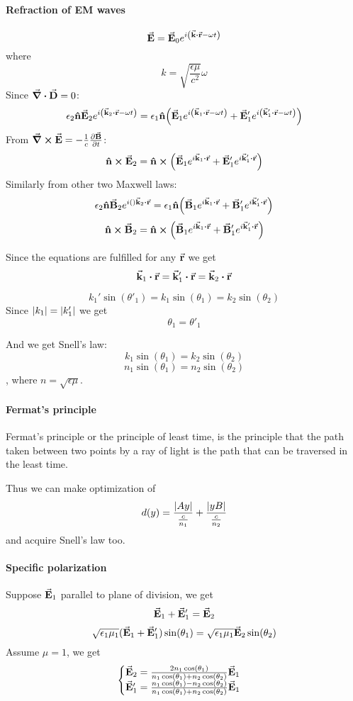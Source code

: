 \paragraph{Refraction of EM waves}

\begin{center}	
\end{center}

$$\va{E}  = \va{E}_0 e^{i\qty(\va{k} \vdot \va{r} - \omega t)}$$
where
$$k = \sqrt{\frac{\epsilon \mu}{c^2}} \omega$$
Since $\div{\va{D}} = 0$:
$$\epsilon_2 \vu{n}  \va{E}_2 e^{i\qty(\va{k}_2 \vdot \va{r} - \omega t)} = \epsilon_1 \vu{n} \qty(\va{E}_1 e^{i\qty(\va{k}_1 \vdot \va{r} - \omega t)}+\va{E}'_1 e^{i\qty(\va{k}'_1 \vdot \va{r} - \omega t)})$$
From $\curl{\va{E}} = -\frac{1}{c}\pdv{\va{B}}{t}$:
$$\vu{n} \cross \va{E}_2 = \vu{n} \cross \qty( \va{E}_1 e^{i\va{k}_1 \vdot \va{r}}+ \va{E}'_1 e^{i\va{k}'_1 \vdot \va{r}})$$
Similarly from other two Maxwell laws:
$$\epsilon_2 \vu{n}  \va{B}_2 e^{i\qty\va{k}_2 \vdot \va{r}} = \epsilon_1 \vu{n} \qty(\va{B}_1 e^{i\va{k}_1 \vdot \va{r} }+\va{B}'_1 e^{i\va{k}'_1 \vdot \va{r}})$$
$$\vu{n} \cross \va{B}_2 = \vu{n} \cross \qty( \va{B}_1 e^{i\va{k}_1 \vdot \va{r}}+ \va{B}'_1 e^{i\va{k}'_1 \vdot \va{r}})$$

Since the equations are fulfilled for any $\va{r}$ we get
$$\va{k}_1 \vdot \va{r} =\va{k}'_1 \vdot \va{r}=\va{k}_2 \vdot \va{r} $$

$$k_1' \sin(\theta'_1) = k_1 \sin (\theta_1) = k_2 \sin(\theta_2)$$
Since $\abs{k_1} = \abs{k'_1}$ we get
$$\theta_1 = \theta'_1$$

And we get Snell's law:
$$k_1 \sin(\theta_1) = k_2 \sin(\theta_2)$$
$$n_1 \sin(\theta_1) = n_2 \sin(\theta_2)$$
, where $n=\sqrt{\epsilon \mu}$.
\paragraph{Fermat's principle}
Fermat's principle or the principle of least time, is the principle that the path taken between two points by a ray of light is the path that can be traversed in the least time. 

Thus we can make optimization of 
$$d(y)= \frac{\abs{Ay}}{\frac{c}{n_1}}+\frac{\abs{yB}}{\frac{c}{n_2}}$$
and acquire Snell's law too.

\paragraph{Specific polarization}
Suppose $\va{E}_1$ parallel to plane of division, we get
$$\va{E}_1+\va{E}'_1 = \va{E}_2$$
$$\sqrt{\epsilon_1 \mu_1} (\va{E}_1 + \va{E}'_1) \sin(\theta_1) = \sqrt{\epsilon_1 \mu_1} \va{E}_2 \sin(\theta_2)$$
Assume $\mu=1$, we get
$$\begin{cases}
\va{E}_2 = \frac{2n_1 \cos(\theta_1)}{n_1 \cos(\theta_1) + n_2 \cos(\theta_2)}\va{E}_1\\
\va{E}'_1 = \frac{n_1 \cos(\theta_1) - n_2 \cos(\theta_2)}{n_1 \cos(\theta_1) + n_2 \cos(\theta_2)}\va{E}_1
\end{cases}$$

